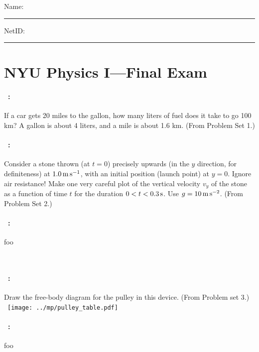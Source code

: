 \documentclass[12pt]{article} 
\begin{document}
\noindent
Name: \rule[-1ex]{0.55\textwidth}{0.1pt}
NetID: \rule[-1ex]{0.2\textwidth}{0.1pt}

\section*{NYU Physics I---Final Exam}

\paragraph{\problemname~\theproblem:}%
If a car gets 20 miles to the gallon, how many liters of fuel
does it take to go 100 km? A gallon is about 4 liters, and a mile is
about 1.6 km.
(From Problem Set 1.)

\vfill

\paragraph{\problemname~\theproblem:}%
Consider a stone thrown (at $t=0$) precisely upwards (in the $y$
direction, for definiteness) at $1.0\,\mathrm{m}\,\mathrm{s}^{-1}$, with an initial
position (launch point) at $y=0$.  Ignore air resistance! Make one
very careful plot of the vertical velocity $v_y$ of the stone as a
function of time $t$ for the duration $0<t<0.3\,\mathrm{s}$. Use
$g=10\,\mathrm{m}\,\mathrm{s}^{-2}$.
(From Problem Set 2.)

\vfill

\paragraph{\problemname~\theproblem:}%
foo

\vfill
~
\clearpage

\paragraph{\problemname~\theproblem:}%
Draw the free-body diagram for the pulley in this device.
(From Problem set 3.)\\
~\hfill\texttt{[image: ../mp/pulley\_table.pdf]}\hfill~

\vfill

\paragraph{\problemname~\theproblem:}%
foo
\end{document}
